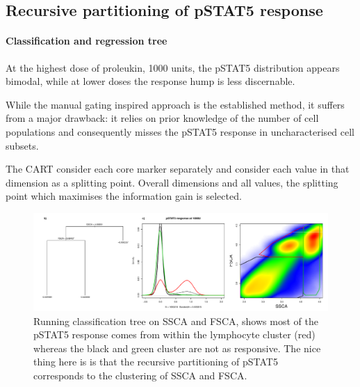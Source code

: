 



\subsection{Recursive partitioning of pSTAT5 response}

\paragraph{Classification and regression tree} 

At the highest dose of proleukin, 1000 units, the pSTAT5 distribution appears bimodal, while at lower doses the response hump is less discernable.

While the manual gating inspired approach is the established method, it suffers from a major drawback:
it relies on prior knowledge of the number of cell populations and consequently misses the pSTAT5 response in uncharacterised cell subsets.

The CART consider each core marker separately and consider each value in that dimension as a splitting point.
Overall dimensions and all values, the splitting point which maximises the information gain is selected.


\hspace{-2cm}
\begin{figure}[h]
\centering
\includegraphics[scale=.45]{IL2/figures/pstat5-response-decision-tree.pdf}
\caption{ \label{figure:pstat5-response-decision-tree}
Running classification tree on SSCA and FSCA, shows most of the pSTAT5 response comes from within the lymphocyte cluster (red) whereas
the black and green cluster are not as responsive.
The nice thing here is is that the recursive partitioning of pSTAT5 corresponds to the clustering of SSCA and FSCA.
}
\end{figure}




